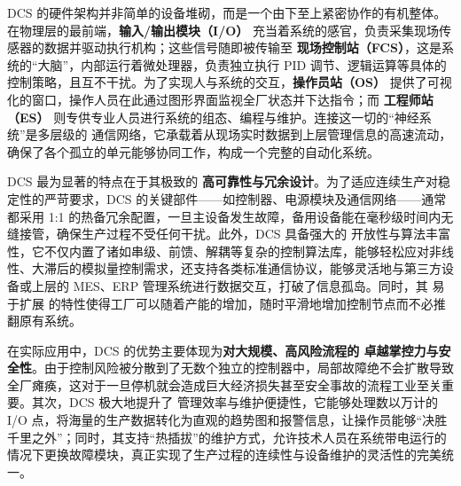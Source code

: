 \documentclass{article}
\begin{document}
DCS 的硬件架构并非简单的设备堆砌，而是一个由下至上紧密协作的有机整体。在物理层的最前端，\textbf{输入/输出模块（I/O）} 充当着系统的感官，负责采集现场传感器的数据并驱动执行机构；这些信号随即被传输至 \textbf{现场控制站（FCS）}，这是系统的“大脑”，内部运行着微处理器，负责独立执行 PID 调节、逻辑运算等具体的控制策略，且互不干扰。为了实现人与系统的交互，\textbf{操作员站（OS）} 提供了可视化的窗口，操作人员在此通过图形界面监视全厂状态并下达指令；而 \textbf{工程师站（ES）} 则专供专业人员进行系统的组态、编程与维护。连接这一切的“神经系统”是多层级的 通信网络，它承载着从现场实时数据到上层管理信息的高速流动，确保了各个孤立的单元能够协同工作，构成一个完整的自动化系统。\par

DCS 最为显著的特点在于其极致的 \textbf{高可靠性与冗余设计}。为了适应连续生产对稳定性的严苛要求，DCS 的关键部件——如控制器、电源模块及通信网络——通常都采用 1:1 的热备冗余配置，一旦主设备发生故障，备用设备能在毫秒级时间内无缝接管，确保生产过程不受任何干扰。此外，DCS 具备强大的 开放性与算法丰富性，它不仅内置了诸如串级、前馈、解耦等复杂的控制算法库，能够轻松应对非线性、大滞后的模拟量控制需求，还支持各类标准通信协议，能够灵活地与第三方设备或上层的 MES、ERP 管理系统进行数据交互，打破了信息孤岛。同时，其 易于扩展 的特性使得工厂可以随着产能的增加，随时平滑地增加控制节点而不必推翻原有系统。\par

在实际应用中，DCS 的优势主要体现为\textbf{对大规模、高风险流程的 卓越掌控力与安全性}。由于控制风险被分散到了无数个独立的控制器中，局部故障绝不会扩散导致全厂瘫痪，这对于一旦停机就会造成巨大经济损失甚至安全事故的流程工业至关重要。其次，DCS 极大地提升了 管理效率与维护便捷性，它能够处理数以万计的 I/O 点，将海量的生产数据转化为直观的趋势图和报警信息，让操作员能够“决胜千里之外”；同时，其支持“热插拔”的维护方式，允许技术人员在系统带电运行的情况下更换故障模块，真正实现了生产过程的连续性与设备维护的灵活性的完美统一。
\end{document}
